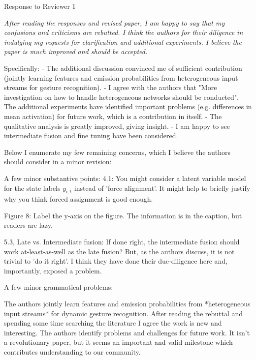 \newcommand{\rev}[1]{{\noindent {\bf Comment:} {\it #1}}~\\[-2mm]}
\newcommand{\ans}[1]{{\noindent {\bf Response:} #1}~\\[-2mm]}
\newcommand{\td}[1]{{\noindent {\bf TODO:} #1}~\\}


\newcommand{\PM}[1]{
~\\[-4mm]
``{\em #1}''
}


\newpage
{\LARGE \noindent Response to Reviewer 1}\newline

\rev{After reading the responses and revised paper, I am happy to say that my
confusions and criticisms are rebutted. I think the authors for their
diligence in indulging my requests for clarification and additional
experiments. I believe the paper is much improved and should be
accepted.

Specifically:
	- The additional discussion convinced me of sufficient
	contribution (jointly learning features and emission
	probabilities from heterogeneous input streams for gesture
	recognition).
	- I agree with the authors that "More investigation on how to
	handle heterogeneous networks should be conducted". The
	additional experiments have identified important problems
	(e.g. differences in mean activation) 
	for future work, which is a contribution in itself.
	- The qualitative analysis is greatly improved, giving insight.  
	- I am happy to see intermediate fusion and fine tuning have
	been considered.

Below I enumerate my few remaining concerns, which I believe the authors
should consider in a minor revision:  

A few minor substantive points:
4.1: You might consider a latent variable model for the state labels
$y_{i,t}$ instead of 'force alignment'. It might help to briefly justify
why you think forced assignment is good enough. 

Figure 8: Label the y-axis on the figure. The information is in the
caption, but readers are lazy. 

5.3, Late vs. Intermediate fusion: If done right, the intermediate
fusion should work at-least-as-well as the late fusion? But, as the
authors discuss, it is not trivial to 'do it right'. I think they have
done their due-diligence here and, importantly, exposed a problem. 

A few minor grammatical problems:

The authors jointly learn features and emission probabilities from
*heterogeneous input streams* for dynamic gesture recognition. After reading the
rebuttal and spending some time searching the literature I agree the
work is new and interesting. The authors identify problems and
challenges for future work. It isn't a revolutionary paper, but it
seems an important and valid milestone which contributes understanding
to our community.}

